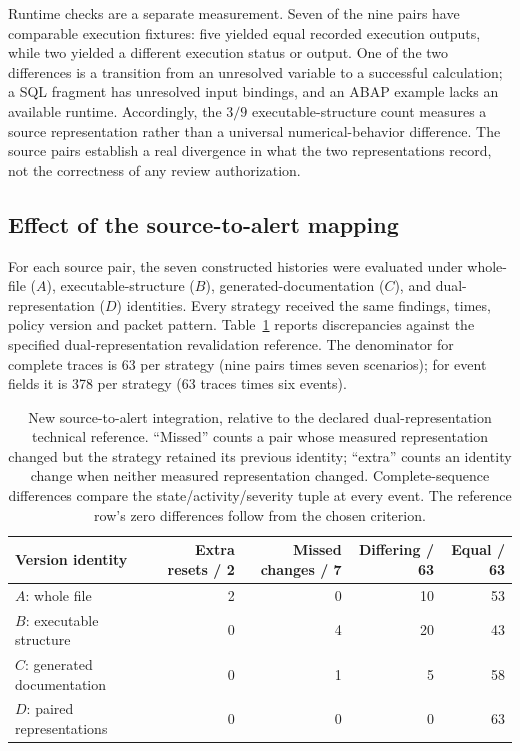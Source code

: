 \documentclass[preprint,11pt]{elsarticle}
\begin{document}
Runtime checks are a separate measurement. Seven of the nine pairs have comparable execution fixtures: five yielded equal recorded execution outputs, while two yielded a different execution status or output. One of the two differences is a transition from an unresolved variable to a successful calculation; a SQL fragment has unresolved input bindings, and an ABAP example lacks an available runtime. Accordingly, the $3/9$ executable-structure count measures a source representation rather than a universal numerical-behavior difference. The source pairs establish a real divergence in what the two representations record, not the correctness of any review authorization.

\subsection{Effect of the source-to-alert mapping}\label{sec:bridge-results}
For each source pair, the seven constructed histories were evaluated under whole-file ($A$), executable-structure ($B$), generated-documentation ($C$), and dual-representation ($D$) identities. Every strategy received the same findings, times, policy version and packet pattern. Table~\ref{tab:bridge-results} reports discrepancies against the specified dual-representation revalidation reference. The denominator for complete traces is 63 per strategy (nine pairs times seven scenarios); for event fields it is 378 per strategy (63 traces times six events).

\begin{table}[ht]
\centering\small
\caption{New source-to-alert integration, relative to the declared dual-representation technical reference. ``Missed'' counts a pair whose measured representation changed but the strategy retained its previous identity; ``extra'' counts an identity change when neither measured representation changed. Complete-sequence differences compare the state/activity/severity tuple at every event. The reference row's zero differences follow from the chosen criterion.}\label{tab:bridge-results}
\begin{tabular}{@{}lrrrr@{}}\toprule
Version identity & Extra resets / 2 & Missed changes / 7 & Differing / 63 & Equal / 63\\\midrule
$A$: whole file & 2 & 0 & 10 & 53\\
$B$: executable structure & 0 & 4 & 20 & 43\\
$C$: generated documentation & 0 & 1 & 5 & 58\\
$D$: paired representations & 0 & 0 & 0 & 63\\\bottomrule
\end{tabular}
\end{table}
\end{document}
